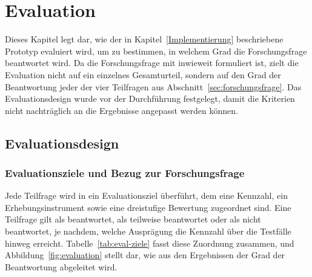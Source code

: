 \chapter{Evaluation}
\label{Evaluation}

Dieses Kapitel legt dar, wie der in Kapitel~\ref{Implementierung} beschriebene Prototyp evaluiert wird, um zu bestimmen, in welchem Grad die Forschungsfrage beantwortet wird. Da die Forschungsfrage mit \glqq inwieweit\grqq{} formuliert ist, zielt die Evaluation nicht auf ein einzelnes Gesamturteil, sondern auf den Grad der Beantwortung jeder der vier Teilfragen aus Abschnitt~\ref{sec:forschungsfrage}. Das Evaluationsdesign wurde vor der Durchführung festgelegt, damit die Kriterien nicht nachträglich an die Ergebnisse angepasst werden können.

\section{Evaluationsdesign}
\label{sec:eval-design}

\subsection{Evaluationsziele und Bezug zur Forschungsfrage}
\label{subsec:eval-ziele}

Jede Teilfrage wird in ein Evaluationsziel überführt, dem eine Kennzahl, ein Erhebungsinstrument sowie eine dreistufige Bewertung zugeordnet sind. Eine Teilfrage gilt als beantwortet, als teilweise beantwortet oder als nicht beantwortet, je nachdem, welche Ausprägung die Kennzahl über die Testfälle hinweg erreicht. Tabelle~\ref{tab:eval-ziele} fasst diese Zuordnung zusammen, und Abbildung~\ref{fig:evaluation} stellt dar, wie aus den Ergebnissen der Grad der Beantwortung abgeleitet wird.

